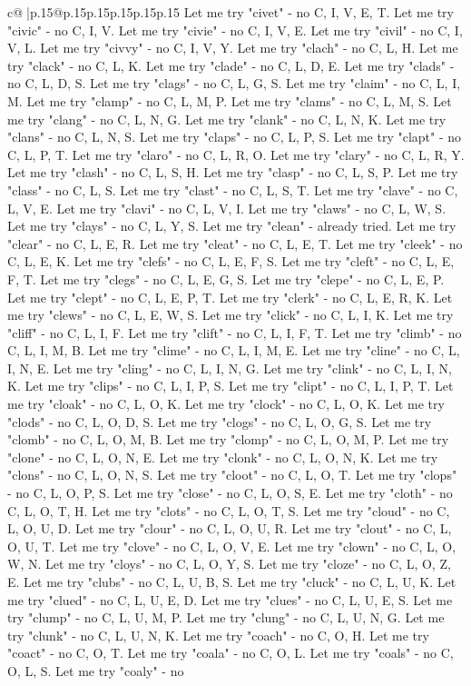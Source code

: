 \documentclass{article}
\begin{document}
{\begin{supertabular}{c@{$\;$}|p{.15\linewidth}@{}p{.15\linewidth}p{.15\linewidth}p{.15\linewidth}p{.15\linewidth}p{.15\linewidth}}
{{{Let me try "civet" {-} no C, I, V, E, T. Let me try "civic" {-} no C, I, V. Let me try "civie" {-} no C, I, V, E. Let me try "civil" {-} no C, I, V, L. Let me try "civvy" {-} no C, I, V, Y. Let me try "clach" {-} no C, L, H. Let me try "clack" {-} no C, L, K. Let me try "clade" {-} no C, L, D, E. Let me try "clads" {-} no C, L, D, S. Let me try "clags" {-} no C, L, G, S. Let me try "claim" {-} no C, L, I, M. Let me try "clamp" {-} no C, L, M, P. Let me try "clams" {-} no C, L, M, S. Let me try "clang" {-} no C, L, N, G. Let me try "clank" {-} no C, L, N, K. Let me try "clans" {-} no C, L, N, S. Let me try "claps" {-} no C, L, P, S. Let me try "clapt" {-} no C, L, P, T. Let me try "claro" {-} no C, L, R, O. Let me try "clary" {-} no C, L, R, Y. Let me try "clash" {-} no C, L, S, H. Let me try "clasp" {-} no C, L, S, P. Let me try "class" {-} no C, L, S. Let me try "clast" {-} no C, L, S, T. Let me try "clave" {-} no C, L, V, E. Let me try "clavi" {-} no C, L, V, I. Let me try "claws" {-} no C, L, W, S. Let me try "clays" {-} no C, L, Y, S. Let me try "clean" {-} already tried. Let me try "clear" {-} no C, L, E, R. Let me try "cleat" {-} no C, L, E, T. Let me try "cleek" {-} no C, L, E, K. Let me try "clefs" {-} no C, L, E, F, S. Let me try "cleft" {-} no C, L, E, F, T. Let me try "clegs" {-} no C, L, E, G, S. Let me try "clepe" {-} no C, L, E, P. Let me try "clept" {-} no C, L, E, P, T. Let me try "clerk" {-} no C, L, E, R, K. Let me try "clews" {-} no C, L, E, W, S. Let me try "click" {-} no C, L, I, K. Let me try "cliff" {-} no C, L, I, F. Let me try "clift" {-} no C, L, I, F, T. Let me try "climb" {-} no C, L, I, M, B. Let me try "clime" {-} no C, L, I, M, E. Let me try "cline" {-} no C, L, I, N, E. Let me try "cling" {-} no C, L, I, N, G. Let me try "clink" {-} no C, L, I, N, K. Let me try "clips" {-} no C, L, I, P, S. Let me try "clipt" {-} no C, L, I, P, T. Let me try "cloak" {-} no C, L, O, K. Let me try "clock" {-} no C, L, O, K. Let me try "clods" {-} no C, L, O, D, S. Let me try "clogs" {-} no C, L, O, G, S. Let me try "clomb" {-} no C, L, O, M, B. Let me try "clomp" {-} no C, L, O, M, P. Let me try "clone" {-} no C, L, O, N, E. Let me try "clonk" {-} no C, L, O, N, K. Let me try "clons" {-} no C, L, O, N, S. Let me try "cloot" {-} no C, L, O, T. Let me try "clops" {-} no C, L, O, P, S. Let me try "close" {-} no C, L, O, S, E. Let me try "cloth" {-} no C, L, O, T, H. Let me try "clots" {-} no C, L, O, T, S. Let me try "cloud" {-} no C, L, O, U, D. Let me try "clour" {-} no C, L, O, U, R. Let me try "clout" {-} no C, L, O, U, T. Let me try "clove" {-} no C, L, O, V, E. Let me try "clown" {-} no C, L, O, W, N. Let me try "cloys" {-} no C, L, O, Y, S. Let me try "cloze" {-} no C, L, O, Z, E. Let me try "clubs" {-} no C, L, U, B, S. Let me try "cluck" {-} no C, L, U, K. Let me try "clued" {-} no C, L, U, E, D. Let me try "clues" {-} no C, L, U, E, S. Let me try "clump" {-} no C, L, U, M, P. Let me try "clung" {-} no C, L, U, N, G. Let me try "clunk" {-} no C, L, U, N, K. Let me try "coach" {-} no C, O, H. Let me try "coact" {-} no C, O, T. Let me try "coala" {-} no C, O, L. Let me try "coals" {-} no C, O, L, S. Let me try "coaly" {-} no }}}
\end{supertabular}}
\end{document}
